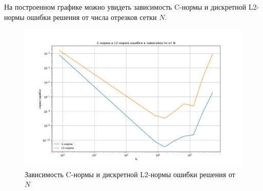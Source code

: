 \documentclass{article}
\begin{document}
На построенном графике можно увидеть зависимость C-нормы и дискретной L2-нормы ошибки решения от числа отрезков сетки $N$.

\begin{figure}[!hq]
    \centering
    \includegraphics[width=1.0\linewidth]{graphic.png}
    \caption{Зависимость C-нормы и дискретной L2-нормы ошибки решения от $N$}
    \label{fig:graphic}
\end{figure}

\newpage
\end{document}
